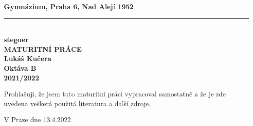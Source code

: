 
\begin{titlepage}
    \begin{center}
        \textbf{\large Gymnázium, Praha 6, Nad Alejí 1952}\\
        \vspace{0.2cm}
        \rule{\textwidth}{0.5pt}\\
        \vspace{5cm}
        \textbf{\Huge stegoer}\\
        \vspace{5cm}
        \textbf{\large MATURITNÍ PRÁCE}\\
        \vspace{2cm}
        \textbf{\large Lukáš Kučera}\\
        \textbf{Oktáva B}\\
        \vspace*{\fill}
        \textbf{\large 2021/2022}\\
    \end{center}
\end{titlepage}
\newpage
Prohlašuji, že jsem tuto maturitní práci vypracoval samostatně a že je zde
uvedena veškerá použitá literatura a další zdroje.\newline
\begin{minipage}{0.7\textwidth}
    \vspace{1cm}
    V Praze dne 13.4.2022
\end{minipage}
\begin{minipage}{0.3\textwidth}
    \vspace{1cm}
    \begin{flushright}
        \vspace{11pt}
        \hrulefill
    \end{flushright}
\end{minipage}
\newpage
